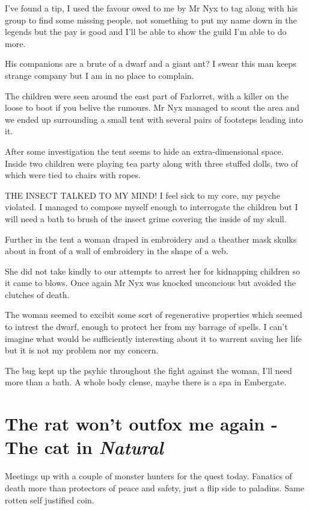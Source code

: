 \documentclass{article}
\begin{document}
I've found a tip, I used the favour owed to me by Mr Nyx to tag along with his group to find some missing people, not something to put my name down in the legends but the pay is good and I'll be able to show the guild I'm able to do more. 

His companions are a brute of a dwarf and a giant ant? I swear this man keeps strange company but I am in no place to complain. 

The children were seen around the east part of Farlorret, with a killer on the loose to boot if you belive the rumours. Mr Nyx managed to scout the area and we ended up surrounding a small tent with several pairs of footsteps leading into it. 

After some investigation the tent seems to hide an extra-dimensional space. Inside two children were playing tea party along with three stuffed dolls, two of which were tied to chairs with ropes.

THE INSECT TALKED TO MY MIND! I feel sick to my core, my psyche violated. I managed to compose myself enough to interrogate the children but I will need a bath to brush of the insect grime covering the inside of my skull.

Further in the tent a woman draped in embroidery and a theather mask skulks about in front of a wall of embroidery in the shape of a web. 

She did not take kindly to our attempts to arrest her for kidnapping children so it came to blows. Once again Mr Nyx was knocked unconcious but avoided the clutches of death. 

The woman seemed to excibit some sort of regenerative properties which seemed to intrest the dwarf, enough to protect her from my barrage of spells. I can't imagine what would be sufficiently interesting about it to warrent saving her life but it is not my problem nor my concern.

The bug kept up the psyhic throughout the fight against the woman, I'll need more than a bath. A whole body clense, maybe there is a spa in Embergate.


\section*{The rat won't outfox me again - The cat in \textit{Natural}}

Meetings up with a couple of monster hunters for the quest today. Fanatics of death more than protectors of peace and safety, just a flip side to paladins. Same rotten self justified coin.
\end{document}
